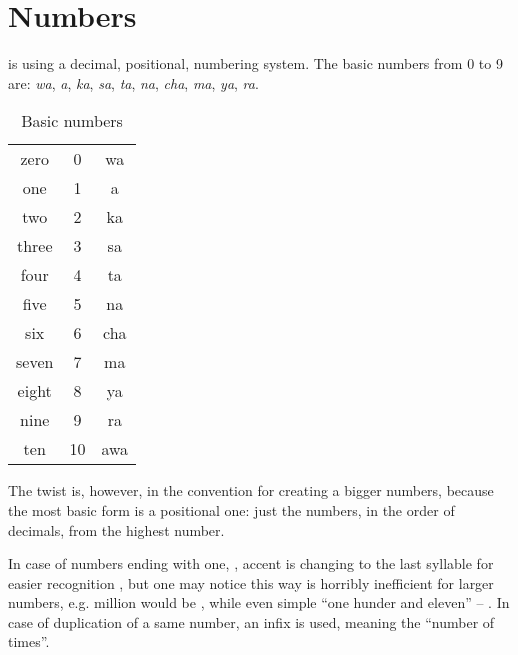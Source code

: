 
\section{Numbers}

\andro is using a decimal, positional, numbering system. The basic numbers from
0 to 9 are: \emph{wa}, \emph{a}, \emph{ka}, \emph{sa}, \emph{ta}, \emph{na},
\emph{cha}, \emph{ma}, \emph{ya}, \emph{ra}.

\begin{table}[ht]
  \centering
  \caption{Basic numbers}
  \begin{tabular}{ccc} \toprule
    zero  & 0  & wa  \\
    one   & 1  & a   \\
    two   & 2  & ka  \\
    three & 3  & sa  \\
    four  & 4  & ta  \\
    five  & 5  & na  \\
    six   & 6  & cha \\
    seven & 7  & ma  \\
    eight & 8  & ya  \\
    nine  & 9  & ra  \\
    ten   & 10 & awa \\\bottomrule
  \end{tabular}
  \label{tab:numerals}
\end{table}

The twist is, however, in the convention for creating a bigger numbers, because
the most basic form is a positional one: just the numbers, in the order of
decimals, from the highest number.




In case of numbers ending with one, , accent is changing to the last
syllable for easier recognition , but one may notice this way is
horribly inefficient for larger numbers, e.g. million would be
, while even simple ``one hunder and eleven'' --
. In case of duplication of a same number, an  infix is
used, meaning the ``number of times''.

